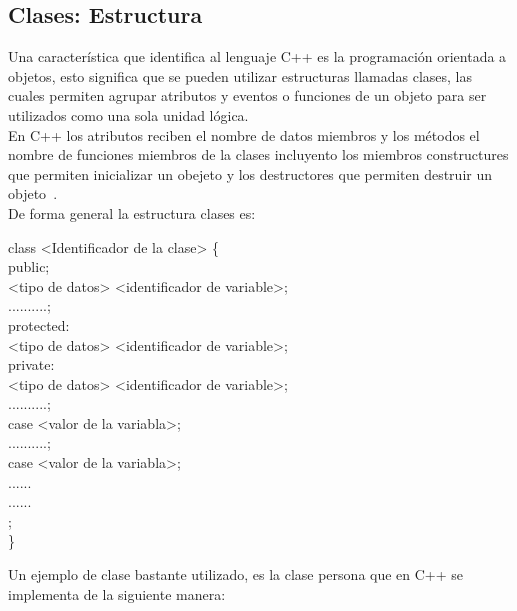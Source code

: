 \documentclass[a4paper,12pt,spanish]{article}
\begin{document}
\subsection{Clases: Estructura}
\label{sec:clases}

Una característica que identifica al lenguaje C++ es la programación orientada a objetos, esto significa que se pueden utilizar estructuras llamadas clases, las cuales permiten agrupar atributos y eventos o funciones de un objeto para ser utilizados como una sola unidad lógica.\\

En C++ los atributos reciben el nombre de datos miembros y los métodos el nombre de funciones miembros de la clases incluyento los miembros constructures que permiten inicializar un obejeto y los destructores que permiten destruir un objeto~\cite{sierra98}.\\

De forma general la estructura clases es:



    \begin{tcolorbox}[title=''estructura de datos CLASS'']
      class <Identificador de la clase> \{\\
        public;\\
        <tipo de datos> <identificador de variable>;\\
        ..........;\\
        protected:\\
        <tipo de datos> <identificador de variable>;\\

        private:\\
        <tipo de datos> <identificador de variable>;\\

        ..........;\\
        case <valor de la variabla>;\\

        
        ..........;\\
        case <valor de la variabla>;\\
        ......\\
        ......\\
;\\
       \}\\
    \end{tcolorbox}
\newpage
  Un ejemplo de clase bastante utilizado, es la clase persona que en C++ se implementa de la siguiente manera:
    
\end{document}

